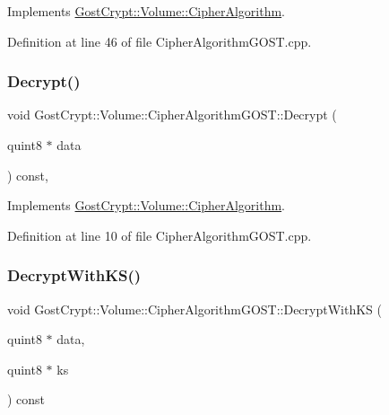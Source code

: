 Implements \hyperlink{class_gost_crypt_1_1_volume_1_1_cipher_algorithm_a53e0b1102294d29252b6438f5bf999aa}{Gost\+Crypt\+::\+Volume\+::\+Cipher\+Algorithm}.



Definition at line 46 of file Cipher\+Algorithm\+G\+O\+S\+T.\+cpp.

\mbox{\label{class_gost_crypt_1_1_volume_1_1_cipher_algorithm_g_o_s_t_a9412774777c6cd1b7d529885d9f1f681}} 
\subsubsection{\texorpdfstring{Decrypt()}{Decrypt()}}
{\footnotesize\ttfamily void Gost\+Crypt\+::\+Volume\+::\+Cipher\+Algorithm\+G\+O\+S\+T\+::\+Decrypt (\begin{DoxyParamCaption}\item[{quint8 $\ast$}]{data }\end{DoxyParamCaption}) const\hspace{0.3cm}{\ttfamily [protected]}, {\ttfamily [virtual]}}



Implements \hyperlink{class_gost_crypt_1_1_volume_1_1_cipher_algorithm_a014d9a3b3db18ec963c0e524b4f0d445}{Gost\+Crypt\+::\+Volume\+::\+Cipher\+Algorithm}.



Definition at line 10 of file Cipher\+Algorithm\+G\+O\+S\+T.\+cpp.

\mbox{\label{class_gost_crypt_1_1_volume_1_1_cipher_algorithm_g_o_s_t_a416b83c6f9605fc342e3f0f3dd7c307c}} 
\subsubsection{\texorpdfstring{Decrypt\+With\+K\+S()}{DecryptWithKS()}}
{\footnotesize\ttfamily void Gost\+Crypt\+::\+Volume\+::\+Cipher\+Algorithm\+G\+O\+S\+T\+::\+Decrypt\+With\+KS (\begin{DoxyParamCaption}\item[{quint8 $\ast$}]{data,  }\item[{quint8 $\ast$}]{ks }\end{DoxyParamCaption}) const\hspace{0.3cm}{\ttfamily [virtual]}}



